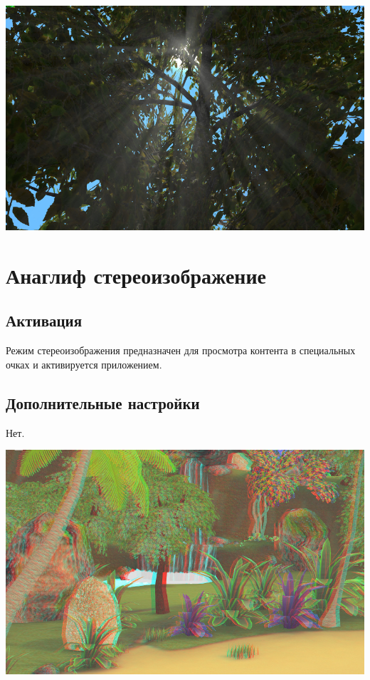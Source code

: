 \documentclass[a4paper,12pt,oneside]{sphinxmanual}
\begin{document}
{\hfill\includegraphics[width=1.000\linewidth]{god_rays.jpg}\hfill}

\begin{DUlineblock}{0em}
\item[] 
\end{DUlineblock}


\section{Анаглиф стереоизображение}
\label{postprocessing_effects:anaglyph}\label{postprocessing_effects:index-4}\label{postprocessing_effects:id14}

\subsection{Активация}
\label{postprocessing_effects:id15}
Режим стереоизображения предназначен для просмотра контента в специальных очках и активируется приложением.


\subsection{Дополнительные настройки}
\label{postprocessing_effects:id16}
Нет.

{\hfill\includegraphics[width=1.000\linewidth]{anaglyph.jpg}\hfill}
\end{document}

